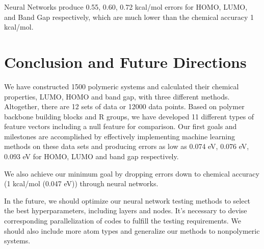 \documentclass[12pt, oneside]{article}   	%
\begin{document}
Neural Networks produce 0.55, 0.60, 0.72 kcal/mol errors for HOMO, LUMO, and Band Gap respectively, which are much lower than the chemical accuracy 1 kcal/mol. 




\section{Conclusion and Future Directions}


We have constructed 1500 polymeric systems and calculated their chemical properties, LUMO, HOMO and band gap, with three different methods. Altogether, there are 12 sets of data or 12000 data points. Based on polymer backbone building blocks and R groups, we have developed 11 different types of feature vectors including a null feature for comparison. Our first goals and milestones are accomplished by effectively implementing machine learning methods on these data sets and producing errors as low as 0.074 eV, 0.076 eV, 0.093 eV for HOMO, LUMO and band gap respectively.

We also achieve our minimum goal by dropping errors down to chemical accuracy (1 kcal/mol (0.047 eV)) through neural networks.

In the future, we should optimize our neural network testing methods to select the best hyperparameters, including layers and nodes. It's necessary to devise corresponding parallelization of codes to fulfill the testing requirements. We should also include more atom types and generalize our methods to nonpolymeric systems.   




\end{document}
